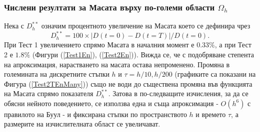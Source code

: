 \documentclass[a4paper]{article}
\newcommand{\be}{\begin{equation}}
\newcommand{\ee}{\end{equation}}
\newcommand{\rf}[1]{(\ref{#1})}
\theoremstyle{remark}
\begin{document}
\subsubsection{Числени резултати за Масата върху по-големи области $\Omega_h$}
Нека с $D_h^{**}$ означим процентното увеличение на Масата което се дефинира чрез
\be
D_h^{**} = 100 \times |D(t=0) - D(t=T)|/D(t=0).
\ee
При Тест 1 увеличението спрямо Масата в началния момент е $0.33\%$, а при Тест 2 е $1.8\%$ (Фигури \rf{Test1En}, \rf{Test2En}). Вижда се, че с подобряване степента на апроксимация, нарастването на масата остава непроменено. Промяна в големината на дискретните стъпки $h$ и $\tau=h/10, h/200$ (графиките са показани на Фигура \rf{Test2TEnMany}) също не води до съществена промяна във функцията на Масата спрямо показателя $D_h^{**}$. Затова в по-следващите изчисления, за да се обясни нейното поведението, се използва една и съща апроксимация - $O(h^6)$ с правилото на Буул - и фиксирана стъпки по пространството $h$ и времето $\tau$, а размерите на изчислителната област се увеличават.
\end{document}
